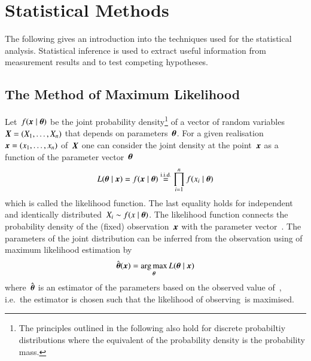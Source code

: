 \section{Statistical Methods}
\label{sec:statistical_methods}

The following gives an introduction into the techniques used for the
statistical analysis. Statistical inference is used to extract useful
information from measurement results and to test competing hypotheses.


\subsection{The Method of Maximum Likelihood}

Let~$f(\myvec{x} \mid \boldtheta)$ be the joint probability
density\footnote{The principles outlined in the following also hold
  for discrete probabiltiy distributions where the equivalent of the
  probability density is the probability mass.} of a vector of random
variables~$\myvec{X} = (X_1, \dots, X_n)$ that depends on
parameters~$\boldtheta$. For a given
realisation~$\myvec{x} = (x_1, \dots, x_n)$ of~$\myvec{X}$ one can
consider the joint density at the point~$\myvec{x}$ as a function of
the parameter vector~$\boldtheta$
\begin{align*}
  L(\boldtheta \mid \boldx) = f(\boldx \mid \boldtheta) \overset{\text{i.i.d.}}{=} \prod_{i=1}^n f(x_i \mid \boldtheta)
\end{align*}
which is called the likelihood function. The last equality holds for
independent and identically
distributed~$X_i \sim f(x \mid \boldtheta)$. The likelihood function
connects the probability density of the (fixed)
observation~$\myvec{x}$ with the parameter vector~\boldtheta. The
parameters of the joint distribution can be inferred from the
observation using of maximum likelihood estimation by
\begin{align*}
  \hat{\boldtheta}(\boldx) = \argmax_{\boldtheta} L(\boldtheta \mid \boldx)
\end{align*}
where~$\hat{\boldtheta}$ is an estimator of the parameters based on
the observed value of~, i.e.\ the estimator is chosen such
that the likelihood of observing~\boldx is maximised.

